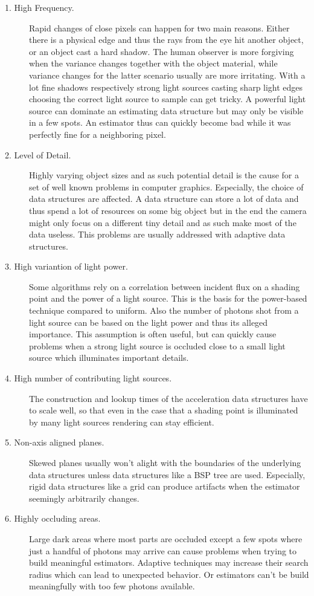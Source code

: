 \begin{description}
    \item[1. High Frequency.] Rapid changes of close pixels can happen for two main reasons. Either there is a physical edge and thus the rays from the eye hit another object, or an object cast a hard shadow. The human observer is more forgiving when the variance changes together with the object material, while variance changes for the latter scenario usually are more irritating. With a lot fine shadows respectively strong light sources casting sharp light edges choosing the correct light source to sample can get tricky. A powerful light source can dominate an estimating data structure but may only be visible in a few spots. An estimator thus can quickly become bad while it was perfectly fine for a neighboring pixel. 
    \item[2. Level of Detail.] Highly varying object sizes and as such potential detail is the cause for a set of well known problems in computer graphics. Especially, the choice of data structures are affected. A data structure can store a lot of data and thus spend a lot of resources on some big object but in the end the camera might only focus on a different tiny detail and as such make most of the data useless. This problems are usually addressed with adaptive data structures.
    \item[3. High variantion of light power.] Some algorithms rely on a correlation between incident flux on a shading point and the power of a light source. This is the basis for the power-based technique compared to uniform. Also the number of photons shot from a light source can be based on the light power and thus its alleged importance. This assumption is often useful, but can quickly cause problems when a strong light source is occluded close to a small light source which illuminates important details.
    \item[4. High number of contributing light sources.] The construction and lookup times of the acceleration data structures have to scale well, so that even in the case that a shading point is illuminated by many light sources rendering can stay efficient.
    \item[5. Non-axis aligned planes.] Skewed planes usually won't alight with the boundaries of the underlying data structures unless data structures like a BSP tree are used. Especially, rigid data structures like a grid can produce artifacts when the estimator seemingly arbitrarily changes. 
    \item[6. Highly occluding areas.] Large dark areas where most parts are occluded except a few spots where just a handful of photons may arrive can cause problems when trying to build meaningful estimators. Adaptive techniques may increase their search radius which can lead to unexpected behavior. Or estimators can't be build meaningfully with too few photons available.

\end{description}
